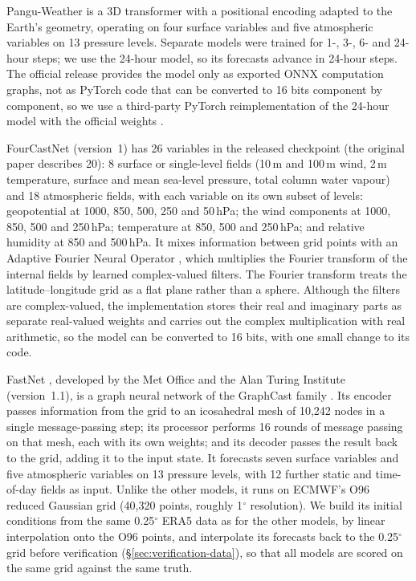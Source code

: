 Pangu-Weather \citep{bi2023pangu} is a 3D transformer with a
positional encoding adapted to the Earth's geometry, operating on four
surface variables and five atmospheric variables on 13 pressure levels.
Separate models were trained for 1-, 3-, 6- and 24-hour steps; we use
the 24-hour model, so its forecasts advance in 24-hour steps. The
official release provides the model only as exported ONNX computation
graphs, not as PyTorch code that can be converted to 16 bits component by
component, so we use a third-party PyTorch reimplementation of the
24-hour model with the official weights \citep{pangu_pytorch}.

FourCastNet \citep{pathak2022fourcastnet} (version~1) has 26 variables in the released
checkpoint (the original paper describes 20):
8 surface or single-level fields (10\,m and 100\,m wind, 2\,m temperature,
surface and mean sea-level pressure, total column water vapour) and 18
atmospheric fields, with each variable on its own subset of levels:
geopotential at 1000, 850, 500, 250 and 50\,hPa; the wind components at
1000, 850, 500 and 250\,hPa; temperature at 850, 500 and 250\,hPa; and
relative humidity at 850 and 500\,hPa. It
mixes information between grid points with an Adaptive Fourier Neural
Operator \citep{guibas2022afno}, which multiplies the Fourier transform
of the internal fields by learned complex-valued filters. The Fourier
transform treats the latitude--longitude grid as a flat plane rather
than a sphere. Although the filters are complex-valued, the
implementation stores their real and imaginary parts as separate
real-valued weights and carries out the complex multiplication with
real arithmetic, so the model can be converted to 16 bits, with one
small change to its code.

FastNet \citep{dunstan2025fastnet, daub2025fastnet}, developed by the
Met Office and the Alan Turing Institute (version~1.1), is a graph
neural network of the GraphCast family \citep{lam2023graphcast}. Its
encoder passes information from the grid to an icosahedral mesh of
10{,}242 nodes in a single message-passing step; its processor performs
16 rounds of message passing on that mesh, each with its own weights;
and its decoder passes the result back to the grid, adding it to the
input state. It forecasts seven surface variables and five atmospheric
variables on 13 pressure levels, with 12 further static and time-of-day
fields as input. Unlike the other models, it runs on ECMWF's O96 reduced
Gaussian grid (40{,}320 points, roughly 1$^\circ$ resolution). We build
its initial conditions from the same 0.25$^\circ$ ERA5 data as for the
other models, by linear interpolation onto the O96 points, and
interpolate its forecasts back to the 0.25$^\circ$ grid before
verification (\S\ref{sec:verification-data}), so that all models are
scored on the same grid against the same truth.

